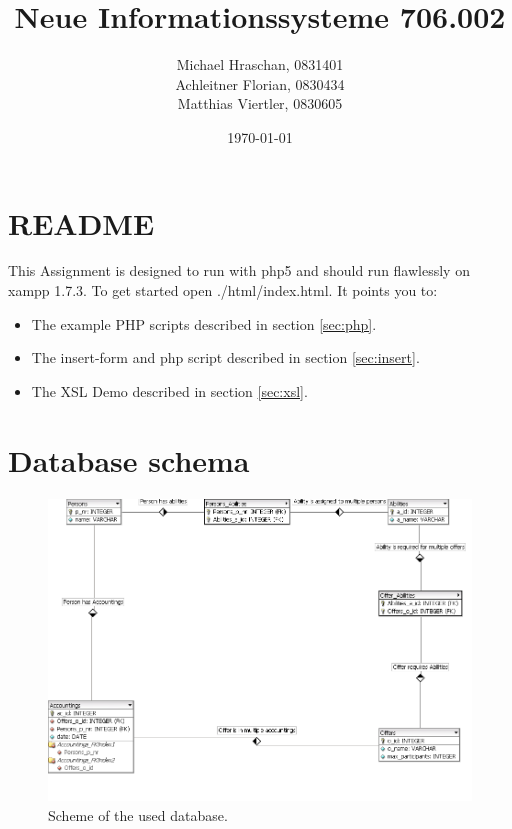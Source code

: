 \documentclass[12pt,a4paper,english]{article}
\title{Neue Informationssysteme 706.002\\}
\date{\today}
\author{Michael Hraschan, 0831401 \\
				Achleitner Florian, 0830434\\
				Matthias Viertler, 0830605 \\}
\begin{document}
\maketitle

\newpage
%
\tableofcontents %
\clearpage
%

\section{README}
This Assignment is designed to run with php5 and should run flawlessly on xampp 1.7.3.
To get started open ./html/index.html.
It points you to:
\begin{itemize}
	\item The example PHP scripts described in section \ref{sec:php}.
	\item The insert-form and php script described in section \ref{sec:insert}.
	\item The XSL Demo described in section \ref{sec:xsl}.
\end{itemize}

\section{Database schema}

\begin{figure}[htbp]
	\centering
		\includegraphics[width=1.00\textwidth]{Images/database_design.png}
	\caption{Scheme of the used database.}
	\label{fig:database_design}
\end{figure}
\end{document}
